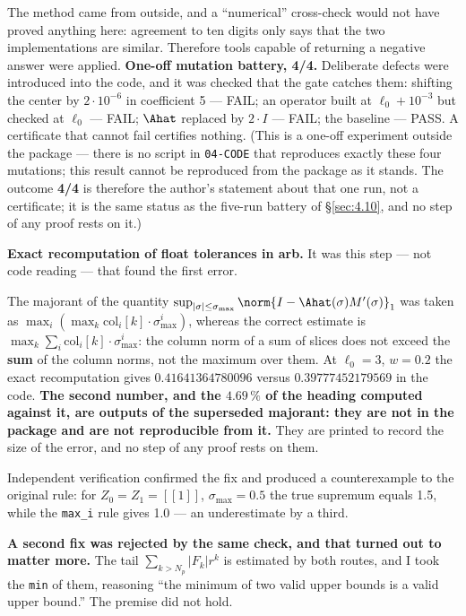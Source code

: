 The method came from outside, and a ``numerical'' cross-check would not have
proved anything here: agreement to ten digits only says that the two
implementations are similar. Therefore tools capable of returning a negative
answer were applied.
\textbf{One-off mutation battery, 4/4.} Deliberate defects were introduced into the
code, and it was checked that the gate catches them: shifting the center by
$2 \cdot 10^{-6}$ in coefficient 5 --- FAIL; an operator built at $\ell_0+10^{-3}$ but checked at
$\ell_0$ --- FAIL; $\Ahat$ replaced by $2 \cdot I$ --- FAIL; the baseline --- PASS. A certificate
that cannot fail certifies nothing. (This is a one-off experiment outside the
package --- there is no script in \texttt{04-CODE} that reproduces exactly these four
mutations; this result cannot be reproduced from the package as it stands. The
outcome \textbf{4/4} is therefore the author's statement about that one run, not
a certificate; it is the same status as the five-run battery of
\S\ref{sec:4.10}, and no step of any proof rests on it.)

\textbf{Exact recomputation of float tolerances in arb.} It was this step --- not
code reading --- that found the first error.

\begin{remark}
The majorant of the quantity
$\sup_{|\sigma| \le \sigma_{\max}} \norm{I - \Ahat(\sigma) M'(\sigma)}_1$ was taken as $\max_i (\max_k \mathrm{col}_i[k] \cdot \sigma_{\max}^i)$,
whereas the correct estimate is $\max_k \sum_i \mathrm{col}_i[k] \cdot \sigma_{\max}^i$: the column norm
of a sum of slices does not exceed the \textbf{sum} of the column norms, not the
maximum over them. At $\ell_0=3$, $w=0.2$ the exact recomputation gives
$0.41641364780096$ versus $0.39777452179569$ in the code.
\textbf{The second number, and the $4.69\,\%$ of the heading computed against
it, are outputs of the superseded majorant: they are not in the package and
are not reproducible from it.} They are printed to record the size of the
error, and no step of any proof rests on them.
\end{remark}

Independent verification confirmed the fix and produced a counterexample to
the original rule: for $Z_0 = Z_1 = [[1]]$, $\sigma_{\max} = 0.5$ the true supremum
equals 1.5, while the \texttt{max\_i} rule gives 1.0 --- an underestimate by a third.

\textbf{A second fix was rejected by the same check, and that turned out to matter
more.} The tail $\sum_{k>N_p} |F_k| r^k$ is estimated by both routes, and I took
the \texttt{min} of them, reasoning ``the minimum of two valid upper bounds is a
valid upper bound.'' The premise did not hold.

